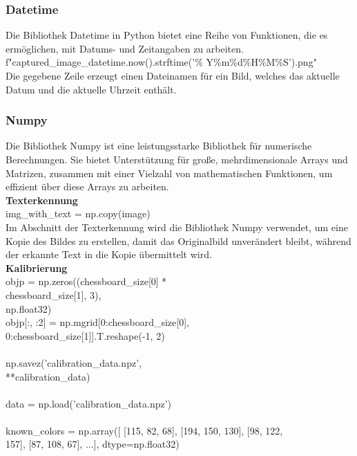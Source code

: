 {\subsubsection{Datetime}
Die Bibliothek Datetime in Python bietet eine Reihe von Funktionen, die es ermöglichen, mit Datums- und Zeitangaben zu arbeiten.\\


f"captured\_image\_{datetime.now().strftime('\% Y\%m\%d\%H\%M\%S')}.png"\\


Die gegebene Zeile erzeugt einen Dateinamen für ein Bild, welches das aktuelle Datum und die aktuelle Uhrzeit enthält.

\subsubsection{Numpy}
Die Bibliothek Numpy ist eine leistungsstarke Bibliothek für numerische Berechnungen. Sie bietet Unterstützung für große, mehrdimensionale Arrays und Matrizen, zusammen mit einer Vielzahl von mathematischen Funktionen, um effizient über diese Arrays zu arbeiten.\\

\textbf{Texterkennung}\\

img\_with\_text = np.copy(image)\\


Im Abschnitt der Texterkennung wird die Bibliothek Numpy verwendet, um eine Kopie des Bildes zu erstellen, damit das Originalbild unverändert bleibt, während der erkannte Text in die Kopie übermittelt wird.\\


\textbf{Kalibrierung}\\


objp = np.zeros((chessboard\_size[0] *\\ chessboard\_size[1], 3), \\
np.float32)\\
objp[:, :2] = np.mgrid[0:chessboard\_size[0], \\
0:chessboard\_size[1]].T.reshape(-1, 2)\\
\\
np.savez('calibration\_data.npz',\\ **calibration\_data)\\
\\
data = np.load('calibration\_data.npz')\\
\\
known\_colors = np.array([
[115, 82, 68], [194, 150, 130], [98, 122,\\ 157], [87, 108, 67], ...],  dtype=np.float32)\\


}
